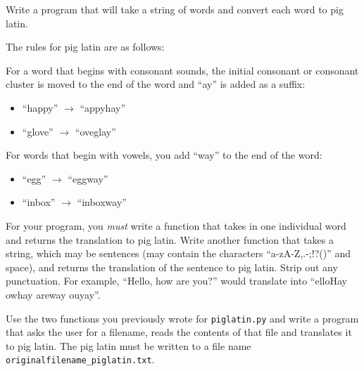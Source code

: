 \documentclass[11pt]{cselabheader}
\begin{document}
\begin{ex}[piglatin.py] Write a program that will take a string of words and
    convert each word to pig latin. 

    The rules for pig latin are as follows:

    For a word that begins with consonant sounds, the initial consonant or
    consonant cluster is moved to the end of the word and ``ay'' is added as a
    suffix:
    \begin{itemize}
      \item ``happy'' $\to$ ``appyhay''
      \item ``glove'' $\to$ ``oveglay''
    \end{itemize}

    For words that begin with vowels, you add ``way'' to the end of the word:
    \begin{itemize}
      \item ``egg'' $\to$ ``eggway''
      \item ``inbox'' $\to$ ``inboxway''
    \end{itemize}

    For your program, you \emph{must} write a function that takes in one
    individual word and returns the translation to pig latin. Write another
    function that takes a string, which may be sentences (may contain the
    characters ``a-zA-Z,.-;!?()'' and space), and returns the translation of the
    sentence to pig latin. Strip out any punctuation. For example, ``Hello, how
    are you?'' would translate into ``elloHay owhay areway ouyay''.
\end{ex}

\begin{ex} Use the two functions you previously wrote for
    \texttt{piglatin.py} and write a program that asks the user for a filename,
    reads the contents of that file and translates it to pig latin. The pig
    latin must be written to a file name
    \texttt{originalfilename\_piglatin.txt}.
  \end{ex}
\end{document}
